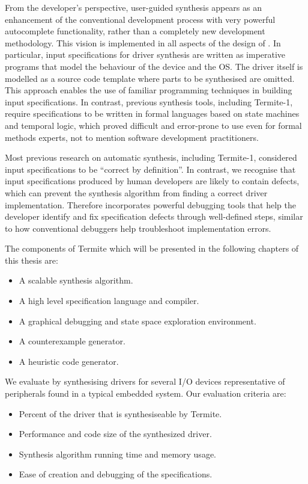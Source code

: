 From the developer's perspective, user-guided synthesis appears as an enhancement of the conventional development process with very powerful autocomplete functionality, rather than a completely new development methodology.  This vision is implemented in all aspects of the design of \termite.  In particular, input specifications for driver synthesis are written as imperative programs that model the behaviour of the device and the OS\@.  The driver itself is modelled as a source code template where parts to be synthesised are omitted.  This approach enables the use of familiar programming techniques in building input specifications.  In contrast, previous synthesis tools, including Termite-1, require specifications to be written in formal languages based on state machines and temporal logic, which proved difficult and error-prone to use even for formal methods experts, not to mention software development practitioners.

Most previous research on automatic synthesis, including Termite-1, considered input specifications to be ``correct by definition''.  In contrast, we recognise that input specifications produced by human developers are likely to contain defects, which can prevent the synthesis algorithm from finding a correct driver implementation.  Therefore \termite incorporates powerful debugging tools that help the developer identify and fix specification defects through well-defined steps, similar to how conventional debuggers help troubleshoot implementation errors.

The components of Termite which will be presented in the following chapters of this thesis are:
\begin{itemize}
    \item A scalable synthesis algorithm.
    \item A high level specification language and compiler.
    \item A graphical debugging and state space exploration environment.
    \item A counterexample generator.
    \item A heuristic code generator.
\end{itemize}

We evaluate \termite by synthesising drivers for several I/O devices representative of peripherals found in a typical embedded system. Our evaluation criteria are:
\begin{itemize}
    \item Percent of the driver that is synthesiseable by Termite.
    \item Performance and code size of the synthesized driver.
    \item Synthesis algorithm running time and memory usage.
    \item Ease of creation and debugging of the specifications.
\end{itemize}

